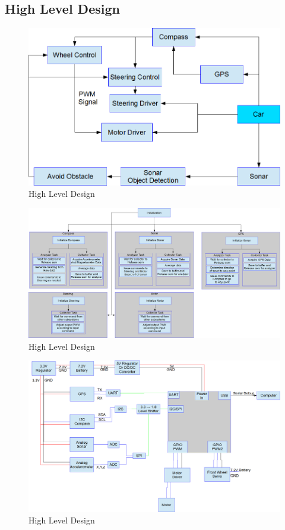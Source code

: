 \documentclass[final,letterpaper,singleside,12pt]{article}
\begin{document}
\subsection{High Level Design} %
\label{sub:high_level_design}
\begin{figure}[H]
\center
\includegraphics[scale=0.4]{HLD_A.png}
\caption{High Level Design}
\label{fig:Alg_loud}
\end{figure}
\label{sub:high_level_design}
\begin{figure}[H]
\center
\includegraphics[scale=0.2]{HLD_B.png}
\caption{High Level Design}
\label{fig:Alg_loud}
\end{figure}
\label{sub:high_level_design}
\begin{figure}[H]
\center
\includegraphics[scale=0.2]{HLD_C.png}
\caption{High Level Design}
\label{fig:Alg_loud}
\end{figure}
\end{document}
